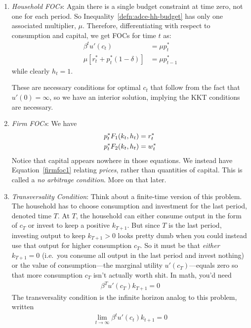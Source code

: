 \documentclass[12pt]{article}
\theoremstyle{plain}
\theoremstyle{definition}
\theoremstyle{remark}
\newcommand{\limt}{\lim_{t\rightarrow\infty}}
\begin{document}
\begin{enumerate}
  \item \emph{Household FOCs}: Again there is a single budget
    constraint at time zero, not one for each period. So
    Inequality~\ref{defn:adce-hh-budget} has only one associated
    multiplier, $\mu$. Therefore, differentiating with respect to
    consumption and capital, we get FOCs for time $t$ as:
    \begin{align}
      \beta^t u'(c_t) &= \mu p_t^* \label{hhfoc1}\\
      \mu[r_t^* + p_t^* (1-\delta)]
      &= \mu p_{t-1}^* \label{hhfoc2}
    \end{align}
    while clearly $h_t=1$.

    These are necessary conditions for optimal $c_t$ that follow from
    the fact that $u'(0)=\infty$, so we have an interior solution,
    implying the KKT conditions are necessary.

  \item \emph{Firm FOCs}: We have
    \begin{align}
      p^*_t F_1(k_t,h_t) &= r_t^* \label{firmfoc1}\\
      p^*_t F_2(k_t,h_t) &= w_t^* \notag
    \end{align}
    Notice that capital appears nowhere in those equations.
    We instead have Equation~\ref{firmfoc1} relating \emph{prices},
    rather than quantities of capital. This is called a
    \emph{no arbitrage condition}. More on that later.

  \item \emph{Transversality Condition}:
    Think about a finite-time version of this problem. The household has
    to choose consumption and investment for the last period, denoted
    time $T$. At $T$, the household can either consume output in the
    form of $c_T$ or invest to keep a positive $k_{T+1}$. But since $T$
    is the last period, investing output to keep $k_{T+1}>0$ looks
    pretty dumb when you could instead use that output for higher
    consumption $c_T$.  So it must be that \emph{either} $k_{T+1}=0$
    (i.e.\ you consume all output in the last period and invest nothing)
    or the value of consumption---the marginal utility
    $u'(c_T)$---equals zero so that more consumption $c_T$ isn't
    actually worth shit. In math, you'd need
    \begin{align*}
      \beta^{T} u'(c_T) k_{T+1} = 0
    \end{align*}
    The transversality condition is the infinite horizon analog to this
    problem, written
    \begin{align*}
      \limt \beta^t u'(c_t) k_{t+1}=0
    \end{align*}


\end{enumerate}
\end{document}
